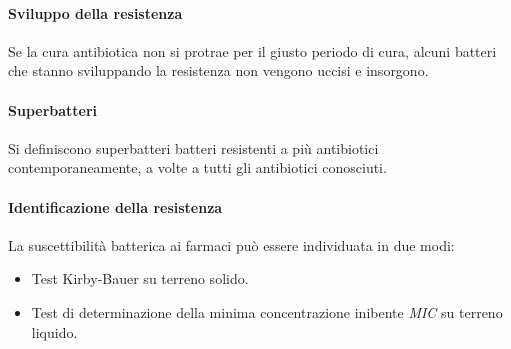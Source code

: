 			\paragraph{Sviluppo della resistenza}
			Se la cura antibiotica non si protrae per il giusto periodo di cura, alcuni batteri che stanno sviluppando la resistenza non vengono uccisi e insorgono.

			\paragraph{Superbatteri}
			Si definiscono superbatteri batteri resistenti a pi\`u antibiotici contemporaneamente, a volte a tutti gli antibiotici conosciuti.

			\paragraph{Identificazione della resistenza}
			La suscettibilit\`a batterica ai farmaci pu\`o essere individuata in due modi:
			\begin{multicols}{2}
				\begin{itemize}
					\item Test Kirby-Bauer su terreno solido.
					\item Test di determinazione della minima concentrazione inibente \emph{MIC} su terreno liquido.
				\end{itemize}
			\end{multicols}

